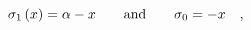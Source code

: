 \begin{equation}
\sigma _{1}\left( x\right) =\alpha -x\qquad \hbox{and\qquad }\sigma
_{0}=-x\quad ,
\end{equation}


